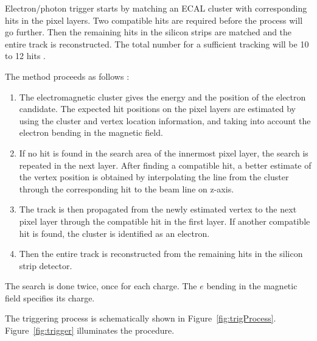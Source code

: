 \documentclass[a4paper,12pt,titlepage]{article}
\begin{document}
Electron/photon trigger starts by matching an ECAL cluster with corresponding hits in the pixel layers. Two compatible hits are required before the process will go further. Then the remaining hits in the silicon strips are matched and the entire track is reconstructed. The total number for a sufficient tracking will be 10 to 12 hits \cite{TechPropCMS, L1Trigger}. 

The method proceeds as follows \cite{matching}:

\begin{itemize}
  
  \begin{enumerate}

  \item The electromagnetic cluster gives the energy and the position of the electron candidate. The expected hit positions on the pixel layers are estimated by using the cluster and vertex location information, and taking into account the electron bending in the magnetic field.
    
  \item If no hit is found in the search area of the innermost pixel layer, the search is repeated in the next layer. After finding a compatible hit, a better estimate of the vertex position is obtained by interpolating the line from the cluster through the corresponding hit to the beam line on z-axis.
    
  \item The track is then propagated from the newly estimated vertex to the next pixel layer through the compatible hit in the first layer. If another compatible hit is found, the cluster is identified as an electron.
  \item Then the entire track is reconstructed from the remaining hits in the silicon strip detector.
    
  \end{enumerate}
\end{itemize}
  
The search is done twice, once for each charge. The $e$ bending in the magnetic field specifies its charge.

The triggering process is schematically shown in Figure~\ref{fig:trigProcess}. Figure~\ref{fig:trigger} illuminates the procedure.
\end{document}
